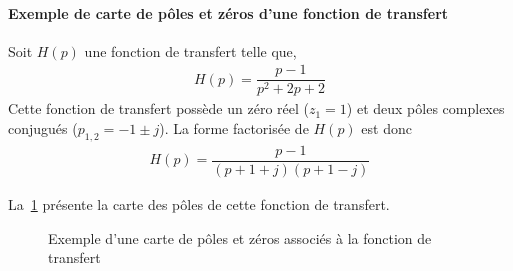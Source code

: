 \paragraph{Exemple de carte de pôles et zéros d'une fonction de transfert}

Soit $H(p)$ une fonction de transfert telle que,
\begin{align}
H(p)=\dfrac{p-1}{p^2+2p+2}\label{eq-ft_carte}
\end{align}
Cette fonction de transfert possède un zéro réel ($z_1=1$) et deux 
pôles complexes conjugués ($p_{1,2}=-1\pm j$).
La forme factorisée de $H(p)$ est donc
\begin{align} 
    H(p)=\dfrac{p-1}{(p+1+j)(p+1-j)}
\end{align}

La~\cref{fig-carte} présente la carte des pôles de cette fonction de transfert.
\begin{figure}[!h]
    \center
    
    \caption{Exemple d'une carte de pôles et zéros associés à la 
             fonction de transfert~\label{fig-carte}}
\end{figure}



